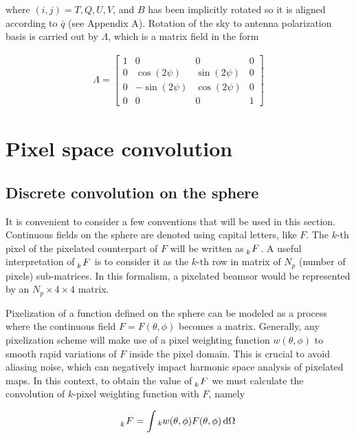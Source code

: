 \documentclass[a4paper,11pt]{article}
\begin{document}
\noindent
where $(i,j) = T,Q,U,V$, and $B$ has been implicitly rotated so it is aligned according to $\bar{q}$ (see Appendix A). Rotation of the sky to antenna polarization basis is carried out by $\Lambda$, which is a matrix field in the form

\begin{equation}
\begin{aligned}
\Lambda =
\begin{bmatrix}
1  & 0 & 0 & 0\\
0  & \cos(2\psi) & \sin(2\psi) & 0\\
0  &-\sin(2\psi) & \cos(2\psi) & 0\\
0  & 0 & 0 & 1
\end{bmatrix}
\end{aligned}
\label{eq::lambda_operator}
\end{equation}

%
\section{Pixel space convolution}
\label{sec::pixel_conv}

\subsection{Discrete convolution on the sphere}

It is convenient to consider a few conventions that will be used in this section. Continuous fields on the sphere are denoted using capital letters, like $F$. The $k$-th pixel of the pixelated counterpart of $F$ will be written as $\tensor[_k]{F}{}$. A useful interpretation of $\tensor[_k]{F}{}$ is to consider it as the $k$-th row in matrix of $N_p$ (number of pixels) sub-matrices. In this formalism, a pixelated beamsor would be represented by an $N_p \times 4 \times 4$ matrix.

Pixelization of a function defined on the sphere can be modeled as a process where the continuous field $F = F(\theta,\phi)$ becomes a matrix. Generally, any pixelization scheme will make use of a pixel weighting function $w(\theta,\phi)$ to smooth rapid variations of $F$ inside the pixel domain. This is crucial to avoid aliasing noise, which can negatively impact harmonic space analysis of pixelated maps. In this context, to obtain the value of $\tensor[_k]{F}{}$ we must calculate the convolution of $k$-pixel weighting function with $F$, namely 

\begin{equation}
\begin{aligned}
\tensor[_k]{F}{} = \int {}_k w (\theta,\phi) F(\theta,\phi) \, \mathrm{d} \Omega
\end{aligned}
\label{eq::howtopixelate}
\end{equation}
\end{document}
